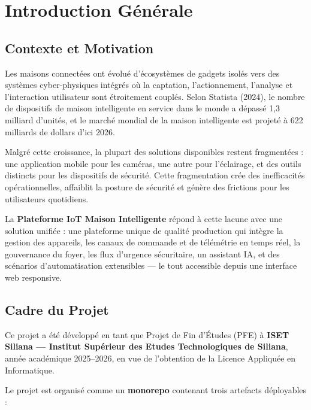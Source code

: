\chapter{Introduction Générale}

\section{Contexte et Motivation}

Les maisons connectées ont évolué d'écosystèmes de gadgets isolés vers des systèmes
cyber-physiques intégrés où la captation, l'actionnement, l'analyse et l'interaction
utilisateur sont étroitement couplés. Selon Statista (2024), le nombre de dispositifs
de maison intelligente en service dans le monde a dépassé 1,3 milliard d'unités, et le
marché mondial de la maison intelligente est projeté à 622 milliards de dollars d'ici 2026.

Malgré cette croissance, la plupart des solutions disponibles restent fragmentées : une
application mobile pour les caméras, une autre pour l'éclairage, et des outils distincts
pour les dispositifs de sécurité. Cette fragmentation crée des inefficacités opérationnelles,
affaiblit la posture de sécurité et génère des frictions pour les utilisateurs quotidiens.

La \textbf{Plateforme IoT Maison Intelligente} répond à cette lacune avec une solution
unifiée : une plateforme unique de qualité production qui intègre la gestion des appareils,
les canaux de commande et de télémétrie en temps réel, la gouvernance du foyer, les flux
d'urgence sécuritaire, un assistant IA, et des scénarios d'automatisation extensibles ---
le tout accessible depuis une interface web responsive.

\section{Cadre du Projet}

Ce projet a été développé en tant que Projet de Fin d'Études (PFE) à
\textbf{ISET Siliana --- Institut Supérieur des Etudes Technologiques de Siliana}, année
académique 2025--2026, en vue de l'obtention de la Licence Appliquée en Informatique.

Le projet est organisé comme un \textbf{monorepo} contenant trois artefacts déployables :

